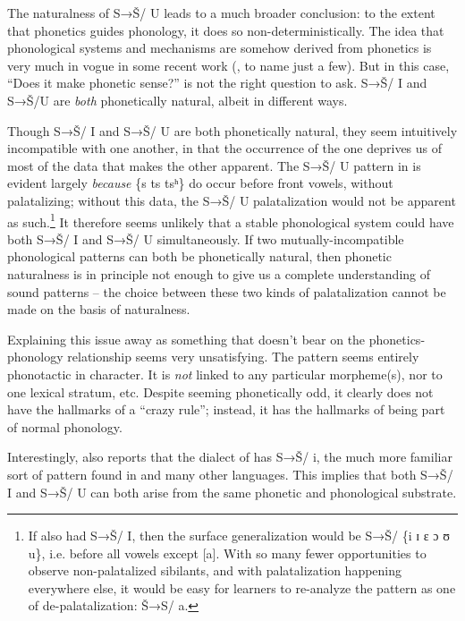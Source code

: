 \documentclass[output=paper,newtxmath,modfonts,nonflat,hidelinks]{langsci/langscibook}
\begin{document}
The naturalness of S→Š/ {\longrule} U leads to a much broader conclusion: to the extent that phonetics guides phonology, it does so non-deterministically. The idea that phonological systems and mechanisms are somehow derived from phonetics is very much in vogue in some recent work (\citealt{Ohala1981,Ohala1990,Ohala:2004aa,Hayes1999,Steriade2008,Kawahara2008}, to name just a few). But in this case, ``Does it make phonetic sense?'' is not the right question to ask. S→Š/ {\longrule} I and S→Š/{\longrule}U are \textit{both} phonetically natural, albeit in different ways.

Though S→Š/ {\longrule} I and S→Š/ {\longrule} U are both phonetically natural, they seem intuitively incompatible with one another, in that the occurrence of the one deprives us of most of the data that makes the other apparent. The S→Š/ {\longrule} U pattern in  is evident largely \textit{because} \{s ts tsʰ\} do occur before front vowels, without palatalizing; without this data, the S→Š/ {\longrule} U palatalization would not be apparent as such.\footnote{If  also had S→Š/ {\longrule} I, then the surface generalization would be S→Š/ {\longrule} \{i ɪ ɛ ɔ ʊ u\}, i.e. before all vowels except [a]. With so many fewer opportunities to observe non-palatalized sibilants, and with palatalization happening everywhere else, it would be easy for learners to re-analyze the pattern as one of de-palatalization: Š→S/ {\longrule} a.} It therefore seems unlikely that a stable phonological system could have both S→Š/ {\longrule} I and S→Š/ {\longrule} U simultaneously. If two mutually-incompatible phonological patterns can both be phonetically natural, then phonetic naturalness is in principle not enough to give us a complete understanding of sound patterns – the choice between these two kinds of palatalization cannot be made on the basis of naturalness.

Explaining this issue away as something that doesn’t bear on the phonetics-phonology relationship seems very unsatisfying. The  pattern seems entirely phonotactic in character. It is \textit{not} linked to any particular morpheme(s), nor to one lexical stratum, etc. Despite seeming phonetically odd, it clearly does not have the hallmarks of a ``crazy rule''; instead, it has the hallmarks of being part of normal phonology. 

Interestingly, \citet{Malepe1966} also reports that the  dialect of  has S→Š/ {\longrule} i, the much more familiar sort of pattern found in  and many other languages. This implies that both S→Š/ {\longrule} I and S→Š/ {\longrule} U can both arise from the same phonetic and phonological substrate. 
\end{document}
